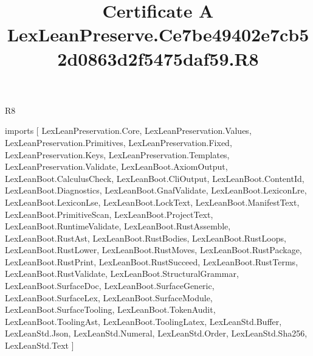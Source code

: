 \begin{lexlean}{R8}
\title{Certificate A LexLeanPreserve.Ce7be49402e7cb52d0863d2f5475daf59.R8}
\begin{coremodule}
imports [
  LexLeanPreservation.Core,
  LexLeanPreservation.Values,
  LexLeanPreservation.Primitives,
  LexLeanPreservation.Fixed,
  LexLeanPreservation.Keys,
  LexLeanPreservation.Templates,
  LexLeanPreservation.Validate,
  LexLeanBoot.AxiomOutput,
  LexLeanBoot.CalculusCheck,
  LexLeanBoot.CliOutput,
  LexLeanBoot.ContentId,
  LexLeanBoot.Diagnostics,
  LexLeanBoot.GnafValidate,
  LexLeanBoot.LexiconLre,
  LexLeanBoot.LexiconLse,
  LexLeanBoot.LockText,
  LexLeanBoot.ManifestText,
  LexLeanBoot.PrimitiveScan,
  LexLeanBoot.ProjectText,
  LexLeanBoot.RuntimeValidate,
  LexLeanBoot.RustAssemble,
  LexLeanBoot.RustAst,
  LexLeanBoot.RustBodies,
  LexLeanBoot.RustLoops,
  LexLeanBoot.RustLower,
  LexLeanBoot.RustMoves,
  LexLeanBoot.RustPackage,
  LexLeanBoot.RustPrint,
  LexLeanBoot.RustSucceed,
  LexLeanBoot.RustTerms,
  LexLeanBoot.RustValidate,
  LexLeanBoot.StructuralGrammar,
  LexLeanBoot.SurfaceDoc,
  LexLeanBoot.SurfaceGeneric,
  LexLeanBoot.SurfaceLex,
  LexLeanBoot.SurfaceModule,
  LexLeanBoot.SurfaceTooling,
  LexLeanBoot.TokenAudit,
  LexLeanBoot.ToolingAst,
  LexLeanBoot.ToolingLatex,
  LexLeanStd.Buffer,
  LexLeanStd.Json,
  LexLeanStd.Numeral,
  LexLeanStd.Order,
  LexLeanStd.Sha256,
  LexLeanStd.Text
]


\end{coremodule}
\end{lexlean}
